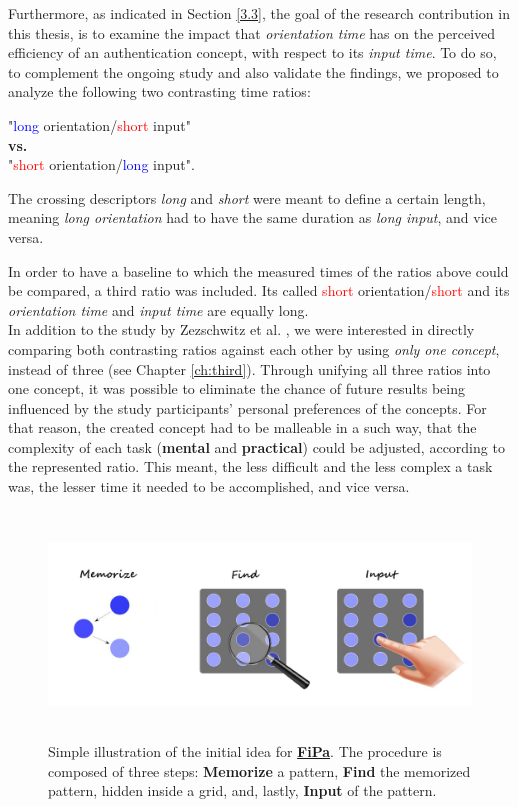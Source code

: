 Furthermore, as indicated in Section \ref{3.3}, the goal of the research contribution in this thesis, is to examine the impact that \textit{orientation time} has on the perceived efficiency of an authentication concept, with respect to its \textit{input time}. To do so, to complement the ongoing study  and also validate the findings, we proposed to analyze the following two contrasting time ratios:  
\begin{center}
    "\textcolor{blue}{long} orientation/\textcolor{red}{short} input" \\
    \textbf{vs.} \\
    "\textcolor{red}{short} orientation/\textcolor{blue}{long} input".
\end{center} 

The crossing descriptors \textit{long} and \textit{short} were meant to define a certain length, meaning \textit{long orientation} had to have the same duration as \textit{long input}, and vice versa. 

In order to have a baseline to which the measured times of the ratios above could be compared, a third ratio was included. Its called \textcolor{red}{short} orientation/\textcolor{red}{short} and its \textit{orientation time} and \textit{input time} are equally long. \\
 

In addition to the study by Zezschwitz et al. \cite{Zezschwitz}, we were interested in directly comparing both contrasting ratios against each other by using \textit{only one concept}, instead of three (see Chapter \ref{ch:third}). Through unifying all three ratios into one concept, it was possible to eliminate the chance of future results being influenced by the study participants' personal preferences of the concepts.
For that reason, the created concept had to be malleable in a such way, that the complexity of each task (\textbf{mental} and \textbf{practical}) could be adjusted, according to the represented ratio. This meant, the less difficult and the less complex a task was, the lesser time it needed to be accomplished, and vice versa. 

\begin{figure}[t!]
\centering
\includegraphics[width=15cm, height=6cm]{Chapters/graphics/ConceptIdea.jpeg}
\caption{Simple illustration of the initial idea for \underline{\textbf{FiPa}}. The procedure is composed of three steps: \textbf{Memorize} a pattern, \textbf{Find} the memorized pattern, hidden inside a grid, and, lastly, \textbf{Input} of the pattern.}
\label{fig:concept}
\end{figure}

